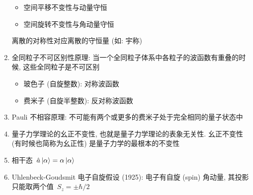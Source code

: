 \documentclass[11pt,a4paper,twocolumn,fleqn]{article}%
\renewcommand{\[}{~$}
\renewcommand{\]}{$~}%
\begin{document}
\begin{enumerate}
\begin{itemize}
  	 \item 空间平移不变性与动量守恒
  	 \item 空间旋转不变性与角动量守恒
  	\end{itemize}
  	离散的对称性对应离散的守恒量 (如: 宇称)
  \item 全同粒子不可区别性原理: 当一个全同粒子体系中各粒子的波函数有重叠的时候, 这些全同粒子是不可区别
  	\begin{itemize}
  	 \item 玻色子 (自旋整数): 对称波函数
  	 \item 费米子 (自旋半整数): 反对称波函数
  	\end{itemize}
  \item Pauli 不相容原理: 不可能有两个或更多的费米子处于完全相同的量子状态中
  \item 量子力学理论的幺正不变性, 也就是量子力学理论的表象无关性. 幺正不变性 (有时候也简称为幺正性) 是量子力学的最根本的不变性
  \item 相干态\[\hat a\ket{\alpha} = \alpha\ket{\alpha}\]
  \item Uhlenbeck-Goudsmit 电子自旋假设 (1925): 电子有自旋 (spin) 角动量, 其投影只能取两个值\[S_z = \pm\hbar/2\]
 \end{enumerate}
 
\end{document}
